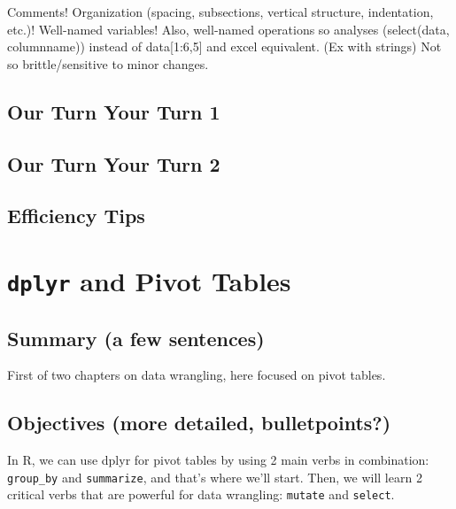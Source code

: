 \documentclass[]{book}
\begin{document}
Comments! Organization (spacing, subsections, vertical structure, indentation, etc.)! Well-named variables! Also, well-named operations so analyses (select(data, columnname)) instead of data{[}1:6,5{]} and excel equivalent. (Ex with strings)
Not so brittle/sensitive to minor changes.

\hypertarget{our-turn-your-turn-1}{%
\section{Our Turn Your Turn 1}\label{our-turn-your-turn-1}}

\hypertarget{our-turn-your-turn-2}{%
\section{Our Turn Your Turn 2}\label{our-turn-your-turn-2}}

\hypertarget{efficiency-tips-2}{%
\section{Efficiency Tips}\label{efficiency-tips-2}}

\hypertarget{pivot}{%
\chapter{\texorpdfstring{\texttt{dplyr} and Pivot Tables}{dplyr and Pivot Tables}}\label{pivot}}

\hypertarget{summary-a-few-sentences-2}{%
\section{Summary (a few sentences)}\label{summary-a-few-sentences-2}}

First of two chapters on data wrangling, here focused on pivot tables.

\hypertarget{objectives-more-detailed-bulletpoints-2}{%
\section{Objectives (more detailed, bulletpoints?)}\label{objectives-more-detailed-bulletpoints-2}}

In R, we can use dplyr for pivot tables by using 2 main verbs in combination: \texttt{group\_by} and \texttt{summarize}, and that's where we'll start. Then, we will learn 2 critical verbs that are powerful for data wrangling: \texttt{mutate} and \texttt{select}.
\end{document}
